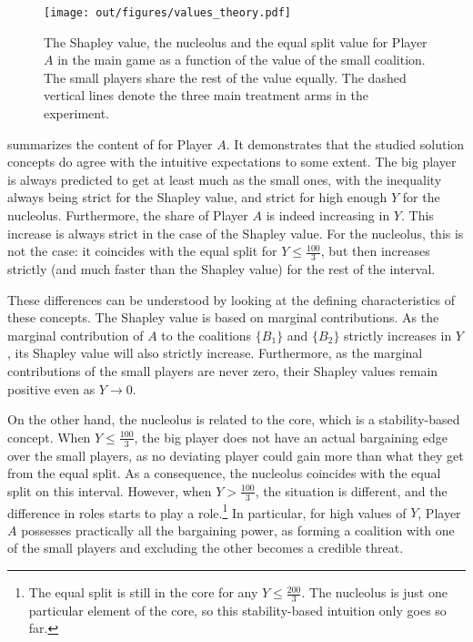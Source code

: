 \begin{figure}
    \centering
    \texttt{[image: out/figures/values\_theory.pdf]}
    \caption{The Shapley value, the nucleolus and the equal split value for Player $A$ in the main game as a function of the value of the small coalition. The small players share the rest of the value equally. The dashed vertical lines denote the three main treatment arms in the experiment.}
    \label{fig:values_theory}
\end{figure}

 summarizes the content of  for Player $A$. It demonstrates that the studied solution concepts do agree with the intuitive expectations to some extent. The big player is always predicted to get at least much as the small ones, with the inequality always being strict for the Shapley value, and strict for high enough $Y$ for the nucleolus. Furthermore, the share of Player $A$ is indeed increasing in $Y$. This increase is always strict in the case of the Shapley value. For the nucleolus, this is not the case: it coincides with the equal split for $Y \leq \frac{100}{3}$, but then increases strictly (and much faster than the Shapley value) for the rest of the interval.

These differences can be understood by looking at the defining characteristics of these concepts. The Shapley value is based on marginal contributions. As the marginal contribution of $A$ to the coalitions $\{B_1\}$ and $\{B_2\}$ strictly increases in $Y$, its Shapley value will also strictly increase. Furthermore, as the marginal contributions of the small players are never zero, their Shapley values remain positive even as $Y \to 0$.

On the other hand, the nucleolus is related to the core, which is a stability-based concept. When $Y \leq \frac{100}{3}$, the big player does not have an actual bargaining edge over the small players, as no deviating player could gain more than what they get from the equal split. As a consequence, the nucleolus coincides with the equal split on this interval. However, when $Y > \frac{100}{3}$, the situation is different, and the difference in roles starts to play a role.\footnote{The equal split is still in the core for any $Y \leq \frac{200}{3}$. The nucleolus is just one particular element of the core, so this stability-based intuition only goes so far.} In particular, for high values of $Y$, Player $A$ possesses practically all the bargaining power, as forming a coalition with one of the small players and excluding the other becomes a credible threat.

